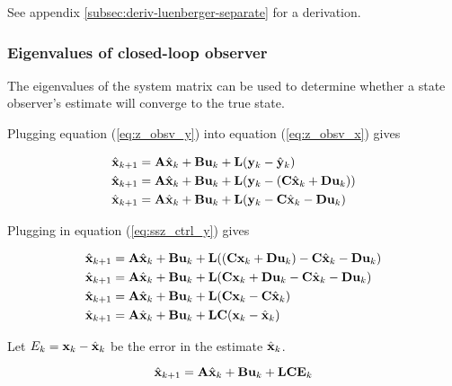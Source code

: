 See appendix \ref{subsec:deriv-luenberger-separate} for a derivation.

\subsubsection{Eigenvalues of closed-loop observer}

The eigenvalues of the system matrix can be used to determine whether a
\gls{state} observer's estimate will converge to the true \gls{state}.

Plugging equation (\ref{eq:z_obsv_y}) into equation (\ref{eq:z_obsv_x}) gives

\begin{align*}
  \hat{\mathbf{x}}_{k+1} &= \mathbf{A}\hat{\mathbf{x}}_k + \mathbf{B}\mathbf{u}_k +
    \mathbf{L} (\mathbf{y}_k - \hat{\mathbf{y}}_k) \\
  \hat{\mathbf{x}}_{k+1} &= \mathbf{A}\hat{\mathbf{x}}_k + \mathbf{B}\mathbf{u}_k +
    \mathbf{L} (\mathbf{y}_k - (\mathbf{C}\hat{\mathbf{x}}_k + \mathbf{D}\mathbf{u}_k)) \\
  \hat{\mathbf{x}}_{k+1} &= \mathbf{A}\hat{\mathbf{x}}_k + \mathbf{B}\mathbf{u}_k +
    \mathbf{L} (\mathbf{y}_k - \mathbf{C}\hat{\mathbf{x}}_k - \mathbf{D}\mathbf{u}_k)
\end{align*}

Plugging in equation (\ref{eq:ssz_ctrl_y}) gives

\begin{align*}
  \hat{\mathbf{x}}_{k+1} &= \mathbf{A}\hat{\mathbf{x}}_k + \mathbf{B}\mathbf{u}_k +
    \mathbf{L}((\mathbf{C}\mathbf{x}_k + \mathbf{D}\mathbf{u}_k) - \mathbf{C}\hat{\mathbf{x}}_k -
    \mathbf{D}\mathbf{u}_k) \\
  \hat{\mathbf{x}}_{k+1} &= \mathbf{A}\hat{\mathbf{x}}_k + \mathbf{B}\mathbf{u}_k +
    \mathbf{L}(\mathbf{C}\mathbf{x}_k + \mathbf{D}\mathbf{u}_k - \mathbf{C}\hat{\mathbf{x}}_k -
    \mathbf{D}\mathbf{u}_k) \\
  \hat{\mathbf{x}}_{k+1} &= \mathbf{A}\hat{\mathbf{x}}_k + \mathbf{B}\mathbf{u}_k +
    \mathbf{L}(\mathbf{C}\mathbf{x}_k - \mathbf{C}\hat{\mathbf{x}}_k) \\
  \hat{\mathbf{x}}_{k+1} &= \mathbf{A}\hat{\mathbf{x}}_k + \mathbf{B}\mathbf{u}_k +
    \mathbf{L}\mathbf{C}(\mathbf{x}_k - \hat{\mathbf{x}}_k)
\end{align*}

Let $E_k = \mathbf{x}_k - \hat{\mathbf{x}}_k$ be the error in the estimate
$\hat{\mathbf{x}}_k$.

\begin{equation*}
  \hat{\mathbf{x}}_{k+1} = \mathbf{A}\hat{\mathbf{x}}_k + \mathbf{B}\mathbf{u}_k +
    \mathbf{L}\mathbf{C}\mathbf{E}_k
\end{equation*}

